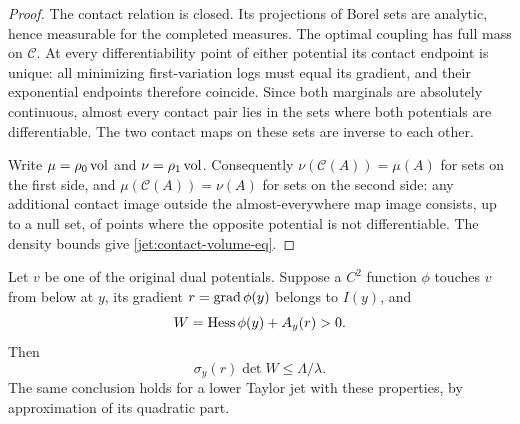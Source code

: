 \begin{proof}
The contact relation is closed. Its projections of Borel sets are
analytic, hence measurable for the completed measures. The optimal
coupling has full mass on $\mathcal C$. At every differentiability point
of either potential its contact endpoint is unique: all minimizing
first-variation logs must equal its gradient, and their exponential
endpoints therefore coincide. Since both marginals are absolutely
continuous, almost every contact pair lies in the sets where both
potentials are differentiable. The two contact maps on these sets are
inverse to each other.

Write $\mu=\rho_0\operatorname{vol}$ and $\nu=\rho_1\operatorname{vol}$. Consequently
$\nu(\mathcal C(A))=\mu(A)$ for sets on the first side, and
$\mu(\mathcal C(A))=\nu(A)$ for sets on the second side: any additional
contact image outside the almost-everywhere map image consists, up to a
null set, of points where the opposite potential is not differentiable.
The density bounds give \eqref{jet:contact-volume-eq}.
\end{proof}

\begin{lemma}
\label{jet:viscosity}
Let $v$ be one of the original dual potentials. Suppose a $C^2$
function $\phi$ touches $v$ from below at $y$, its gradient
$r=\operatorname{grad}\phi(y)$ belongs to $I(y)$, and
\[
 W=\operatorname{Hess}\phi(y)+A_y(r)>0.
\]
Then
\begin{equation}\label{jet:viscosity-eq}
 \sigma_y(r)\det W\le \Lambda/\lambda.
\end{equation}
The same conclusion holds for a lower Taylor jet with these
properties, by approximation of its quadratic part.
\end{lemma}

